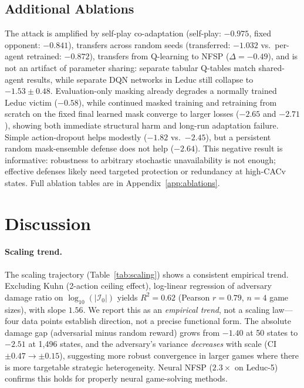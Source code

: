 \documentclass{article}
\begin{document}
\subsection{Additional Ablations}
The attack is amplified by self-play co-adaptation (self-play: $-0.975$, fixed opponent: $-0.841$), transfers across random seeds (transferred: $-1.032$ vs.\ per-agent retrained: $-0.872$), transfers from Q-learning to NFSP ($\Delta=-0.49$), and is not an artifact of parameter sharing: separate tabular Q-tables match shared-agent results, while separate DQN networks in Leduc still collapse to $-1.53 \pm 0.48$. Evaluation-only masking already degrades a normally trained Leduc victim ($-0.58$), while continued masked training and retraining from scratch on the fixed final learned mask converge to larger losses ($-2.65$ and $-2.71$), showing both immediate structural harm and long-run adaptation failure. Simple action-dropout helps modestly ($-1.82$ vs.\ $-2.45$), but a persistent random mask-ensemble defense does not help ($-2.64$). This negative result is informative: robustness to arbitrary stochastic unavailability is not enough; effective defenses likely need targeted protection or redundancy at high-CACv states. Full ablation tables are in Appendix~\ref{app:ablations}.

\section{Discussion}

\paragraph{Scaling trend.}
The scaling trajectory (Table~\ref{tab:scaling}) shows a consistent empirical trend. Excluding Kuhn (2-action ceiling effect), log-linear regression of adversary damage ratio on $\log_{10}(|\mathcal{I}_0|)$ yields $R^2 = 0.62$ (Pearson $r = 0.79$, $n = 4$ game sizes), with slope $1.56$. We report this as an \emph{empirical trend}, not a scaling law---four data points establish direction, not a precise functional form. The absolute damage gap (adversarial minus random reward) grows from $-1.40$ at 50 states to $-2.51$ at 1,496 states, and the adversary's variance \emph{decreases} with scale (CI $\pm 0.47 \to \pm 0.15$), suggesting more robust convergence in larger games where there is more targetable strategic heterogeneity. Neural NFSP ($2.3\times$ on Leduc-5) confirms this holds for properly neural game-solving methods.
\end{document}
